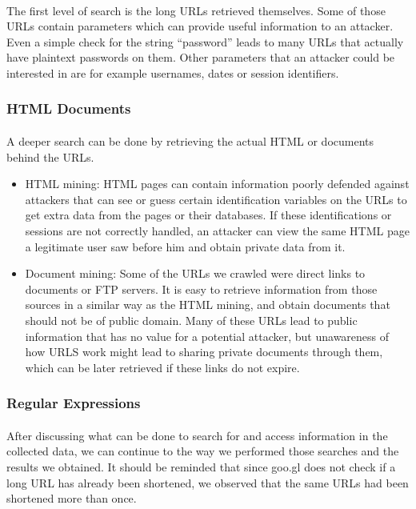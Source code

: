 \documentclass[12pt]{article}
\begin{document}
\paragraph{}
The first level of search is the long URLs retrieved themselves. Some of those URLs contain parameters which can provide useful information to an attacker. Even a simple check for the string “password” leads to many URLs that actually have plaintext passwords on them. Other parameters that an attacker could be interested in are for example usernames, dates or session identifiers.

\subsubsection{HTML Documents}

\paragraph{}
A deeper search can be done by retrieving the actual HTML or documents behind the URLs.

\begin{itemize}

\item  HTML mining: HTML pages can contain information poorly defended against attackers that can see or guess certain identification variables on the URLs to get extra data from the pages or their databases. If these identifications or sessions are not correctly handled, an attacker can view the same HTML page a legitimate user saw before him and obtain private data from it.

\item  Document mining: Some of the URLs we crawled were direct links to documents or FTP servers. It is easy to retrieve information from those sources in a similar way as the HTML mining, and obtain documents that should not be of public domain. Many of these URLs lead to public information that has no value for a potential attacker, but unawareness of how URLS work might lead to sharing private documents through them, which can be later retrieved if these links do not expire.

\end{itemize}

\subsubsection{Regular Expressions}

\paragraph{}
After discussing what can be done to search for and access information in the collected data, we can continue to the way we performed those searches and the results we obtained. It should be reminded that since goo.gl does not check if a long URL has already been shortened, we observed that the same URLs had been shortened more than once.
\end{document}

